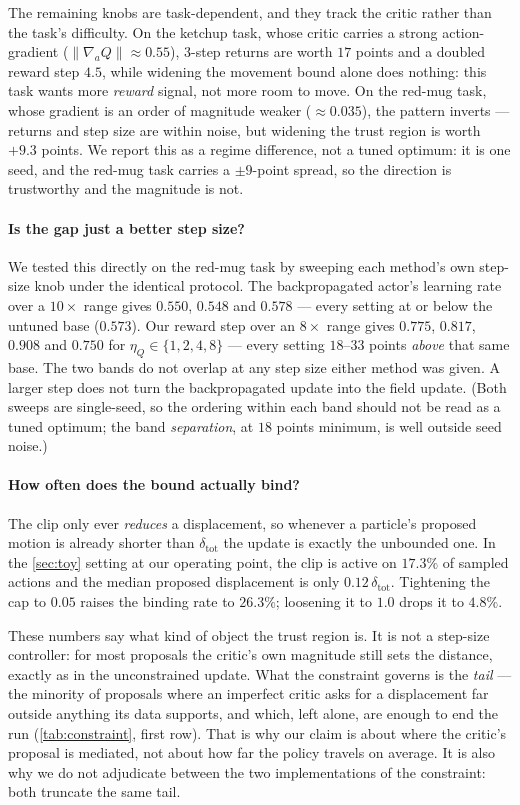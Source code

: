The remaining knobs are task-dependent, and they track the critic rather
than the task's difficulty. On the ketchup task, whose critic carries a strong
action-gradient ($\|\nabla_a Q\|\!\approx\!0.55$), $3$-step returns are
worth $17$ points and a doubled reward step $4.5$, while widening the
movement bound alone does nothing: this task wants more \emph{reward}
signal, not more room to move. On the red-mug task, whose gradient is an order of
magnitude weaker ($\approx\!0.035$), the pattern inverts --- returns and
step size are within noise, but widening the trust region is worth $+9.3$
points. We report this as a regime difference, not a tuned optimum: it is
one seed, and the red-mug task carries a $\pm 9$-point spread, so the direction is
trustworthy and the magnitude is not.

\paragraph{Is the gap just a better step size?} We tested this directly on
the red-mug task by sweeping each method's own step-size knob under the identical
protocol. The backpropagated actor's learning rate over a $10\times$ range
gives $0.550$, $0.548$ and $0.578$ --- every setting at or below the untuned
base ($0.573$). Our reward step over an $8\times$ range gives $0.775$,
$0.817$, $0.908$ and $0.750$ for $\eta_Q \in \{1,2,4,8\}$ --- every setting
$18$--$33$ points \emph{above} that same base. The two bands do not overlap
at any step size either method was given. A larger step does not turn the
backpropagated update into the field update. (Both sweeps are single-seed,
so the ordering within each band should not be read as a tuned optimum; the
band \emph{separation}, at $18$ points minimum, is well outside seed noise.)

\paragraph{How often does the bound actually bind?} The clip only ever
\emph{reduces} a displacement, so whenever a particle's proposed motion is
already shorter than $\delta_{\mathrm{tot}}$ the update is exactly the
unbounded one. In the \cref{sec:toy} setting at our operating point, the
clip is active on $17.3\%$ of sampled actions and the median proposed
displacement is only $0.12\,\delta_{\mathrm{tot}}$. Tightening the cap to
$0.05$ raises the binding rate to $26.3\%$; loosening it to $1.0$ drops it
to $4.8\%$.

These numbers say what kind of object the trust region is. It is not a
step-size controller: for most proposals the critic's own magnitude still
sets the distance, exactly as in the unconstrained update. What the
constraint governs is the \emph{tail} --- the minority of proposals where an
imperfect critic asks for a displacement far outside anything its data
supports, and which, left alone, are enough to end the run
(\cref{tab:constraint}, first row). That is why our claim is about where the
critic's proposal is mediated, not about how far the policy travels on
average. It is also why we do not adjudicate between the two implementations
of the constraint: both truncate the same tail.


